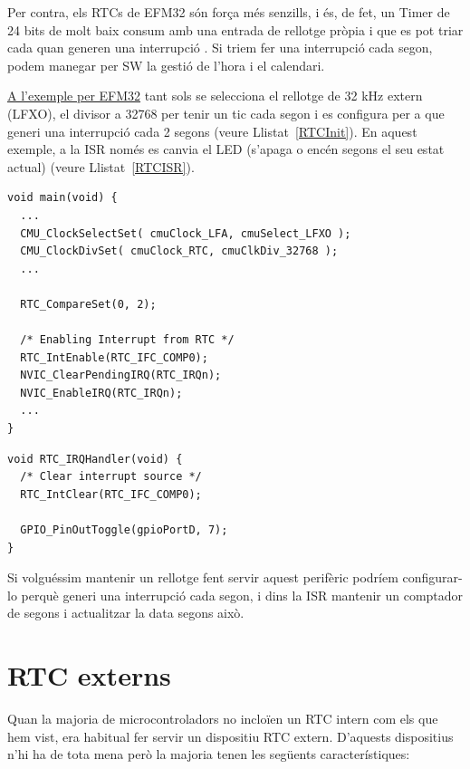 Per contra, els RTCs de EFM32 són força més senzills, i és, de fet, un Timer de 24 bits de molt baix consum amb una entrada de rellotge pròpia i que es pot triar cada quan generen una interrupció \cite[285]{EFM32GRM}. Si triem fer una interrupció cada segon, podem manegar per SW la gestió de l'hora i el calendari.

\href{https://github.com/mariusmm/cursembedded/tree/master/Simplicity/RTC}{A l'exemple per EFM32} tant sols se selecciona el rellotge de 32 kHz extern (LFXO), el divisor a 32768 per tenir un tic cada segon i es configura per a que generi una interrupció cada 2 segons (veure Llistat~\ref{RTCInit}). En aquest exemple, a la \gls{ISR} només es canvia el LED (s'apaga o encén segons el seu estat actual) (veure Llistat~\ref{RTCISR}).

\begin{lstlisting}[style=customc, caption={Inicialització del RTC}, label=RTCInit]
void main(void) {
  ...
  CMU_ClockSelectSet( cmuClock_LFA, cmuSelect_LFXO );
  CMU_ClockDivSet( cmuClock_RTC, cmuClkDiv_32768 );
  ...

  RTC_CompareSet(0, 2);

  /* Enabling Interrupt from RTC */
  RTC_IntEnable(RTC_IFC_COMP0);
  NVIC_ClearPendingIRQ(RTC_IRQn);
  NVIC_EnableIRQ(RTC_IRQn);
  ...
}
\end{lstlisting}

\begin{lstlisting}[style=customc,caption={ISR del RTC},label=RTCISR]
void RTC_IRQHandler(void) {
  /* Clear interrupt source */
  RTC_IntClear(RTC_IFC_COMP0);

  GPIO_PinOutToggle(gpioPortD, 7);
}
\end{lstlisting}


Si volguéssim mantenir un rellotge fent servir aquest perifèric podríem configurar-lo perquè generi una interrupció cada segon, i dins la \gls{ISR} mantenir un comptador de segons i actualitzar la data segons això.

\section{RTC externs}
Quan la majoria de microcontroladors no incloïen un RTC intern com els que hem vist, era habitual fer servir un dispositiu \gls{RTC} extern. D'aquests dispositius n'hi ha de tota mena però la majoria tenen les següents característiques:

